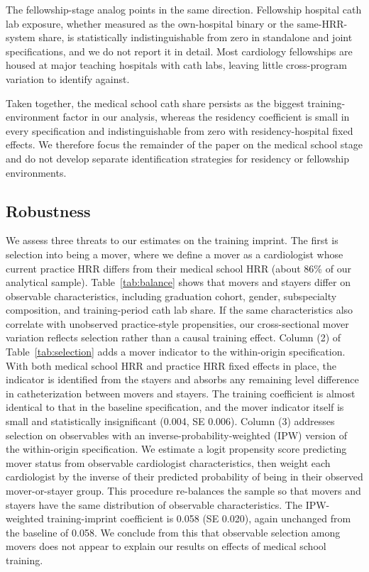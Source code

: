 \documentclass[12pt]{article}
\begin{document}
The fellowship-stage analog points in the same direction. Fellowship hospital cath lab exposure, whether measured as the own-hospital binary or the same-HRR-system share, is statistically indistinguishable from zero in standalone and joint specifications, and we do not report it in detail. Most cardiology fellowships are housed at major teaching hospitals with cath labs, leaving little cross-program variation to identify against.

Taken together, the medical school cath share persists as the biggest training-environment factor in our analysis, whereas the residency coefficient is small in every specification and indistinguishable from zero with residency-hospital fixed effects. We therefore focus the remainder of the paper on the medical school stage and do not develop separate identification strategies for residency or fellowship environments.

\subsection{Robustness}\label{sec:imprint-robust}

We assess three threats to our estimates on the training imprint. The first is selection into being a mover, where we define a mover as a cardiologist whose current practice HRR differs from their medical school HRR (about 86\% of our analytical sample). Table~\ref{tab:balance} shows that movers and stayers differ on observable characteristics, including graduation cohort, gender, subspecialty composition, and training-period cath lab share. If the same characteristics also correlate with unobserved practice-style propensities, our cross-sectional mover variation reflects selection rather than a causal training effect. Column (2) of Table~\ref{tab:selection} adds a mover indicator to the within-origin specification. With both medical school HRR and practice HRR fixed effects in place, the indicator is identified from the stayers and absorbs any remaining level difference in catheterization between movers and stayers. The training coefficient is almost identical to that in the baseline specification, and the mover indicator itself is small and statistically insignificant (0.004, SE 0.006). Column (3) addresses selection on observables with an inverse-probability-weighted (IPW) version of the within-origin specification. We estimate a logit propensity score predicting mover status from observable cardiologist characteristics, then weight each cardiologist by the inverse of their predicted probability of being in their observed mover-or-stayer group. This procedure re-balances the sample so that movers and stayers have the same distribution of observable characteristics. The IPW-weighted training-imprint coefficient is 0.058 (SE 0.020), again unchanged from the baseline of 0.058. We conclude from this that observable selection among movers does not appear to explain our results on effects of medical school training.
\end{document}
